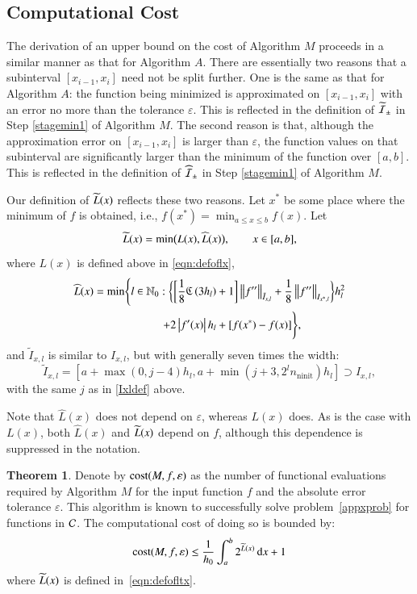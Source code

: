 \documentclass[review]{elsarticle}
\newcommand{\abstol}{\varepsilon}
\theoremstyle{definition}
\newcommand{\Ixl}{I_{x,l}}
\newcommand{\chL}{\widehat{L}}
\DeclareMathOperator{\ninit}{ninit}
\newtheorem{theorem}{Theorem}
\begin{document}
\subsection{Computational Cost} \label{subsec:optcost}
The derivation of an upper bound on the cost of Algorithm $M$ proceeds in a
similar manner as that for Algorithm $A$. There are essentially two reasons that a
subinterval $[x_{i-1},x_i]$ need not be split further. One is the same as that
for Algorithm $A$: the function being minimized is approximated on
$[x_{i-1},x_i]$ with an error no more than the tolerance $\abstol$. This is 
reflected in the definition of $\widetilde{\mathcal{I}}_{\pm}$ in Step \ref{stagemin1} of Algorithm 
$M$.  The second
reason is that, although the approximation error on $[x_{i-1},x_i]$ is larger
than $\abstol$, the function values on that subinterval are significantly larger
than the minimum of the function over $[a,b]$.  This is reflected in the definition of 
$\widehat{\mathcal{I}}_{\pm}$ in Step \ref{stagemin1} of Algorithm $M$. 

Our definition of $\widetilde{L}(x)$ reflects these two reasons. Let $x^*$ be some place
where the minimum of $f$ is obtained, i.e.,
$f(x^*)  = \min_{a \le x \le b} f(x).$
Let
\begin{equation}\label{eqn:defofltx}
\tL(x) = \min\bigl(L(x),\chL(x)\bigr), \qquad x \in [a,b],
\end{equation}
where $L(x)$ is defined above in \eqref{eqn:defoflx}, 
\begin{multline}\label{eqn:defoflt1x}
\chL(x) = \min \Biggl\{ l \in \mathbb{N}_0 :  \biggl\{ \biggl[\frac 18 \fC\left(3h_l\right) + 1 
\biggr]   \norm[\tilde{I}_{x,l}]{f''} + \frac18\norm[{I_{x^*,l}}]{f''} \biggr\} h_{l}^2 \\ \qquad 
\qquad +  2 \abs{f'(x)} h_{l} + [f(x^*) - f(x)] \Biggr\},
\end{multline}
and $\tilde{I}_{x,l}$ is similar to $\Ixl$, but with generally seven times the width:
\begin{equation}
\tilde{I}_{x,l}=\left[a+\max(0,j-4)h_l, a+ \min(j+3,2^l n_{\ninit})h_l\right] \supset \Ixl,
\end{equation}
with the same $j$ as in \eqref{Ixldef} above. 


Note that $\chL(x)$ does not depend on $\abstol$, whereas $L(x)$ does. As is the
case with $L(x)$, both $\chL(x)$ and $\widetilde{L}(x)$ depend on $f$, although this
dependence is suppressed in the notation.

\begin{theorem}\label{thm:Mcost}
	Denote by $\cost(M,f,\abstol)$ as the number of functional evaluations required by 
	Algorithm $M$ for the input function $f$ and the absolute error tolerance $\abstol$.  
	This algorithm is known to successfully solve problem~\eqref{appxprob} for functions 
	in $\mathcal{C}$.  The computational cost of doing so is bounded by:
	\begin{equation*}
	\cost(M,f,\abstol) \le \frac{1}{h_0}\int_a^b 2^{\tL(x)} \, \dif x +1 \\
	\end{equation*}
	where $\widetilde{L}(x)$ is defined in~\eqref{eqn:defofltx}.
\end{theorem}
\end{document}
